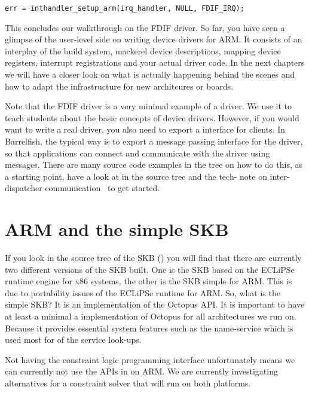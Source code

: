\documentclass[a4paper,11pt,twoside]{report}
\begin{document}
\begin{lstlisting}[caption={Register to receive an Interrupt.}, label={lst:irqregister}]
err = inthandler_setup_arm(irq_handler, NULL, FDIF_IRQ);
\end{lstlisting}

This concludes our walkthrough on the FDIF driver. So far, you have seen a
glimpse of the user-level side on writing device drivers for ARM. It consists
of an interplay of the build system, mackerel device descriptions,  mapping
device registers, interrupt registrations and your actual driver code. In the
next chapters we will have a closer look on what is actually happening behind
the scenes and how to adapt the infrastructure for new architcures or boards.

Note that the FDIF driver is a very minimal example of a driver. We use it to
teach students about the basic concepts of device drivers. However, if you
would want to write a real driver, you also need to export a interface for
clients. In Barrelfish, the typical way is to export a message passing
interface for the driver, so that applications can connect and communicate
with the driver using messages. There are many source code examples in the
tree on how to do this, as a starting point, have a look at
 in the source tree and the tech-
note on inter-dispatcher communication~\cite{btn011-idc} to get started.


\section{ARM and the simple SKB}
\label{sec:simpleskb}

If you look in the source tree of the SKB () you will find
that there are currently two different versions of the SKB built. One is the
SKB based on the ECLiPSe runtime engine for x86 systems, the other is the SKB
simple for ARM. This is due to portability issues of the ECLiPSe runtime for
ARM. So, what is the simple SKB? It is an implementation of the Octopus API.
It is important to have at least a minimal a implementation of Octopus for all
architectures we run on. Because it provides essential system features such as
the name-service which is used most for of the service look-ups.

Not having the constraint logic programming interface unfortunately means we
can currently not use the APIs in  on ARM. We are currently
investigating alternatives for a constraint solver that will run on both
platforms.
\end{document}
